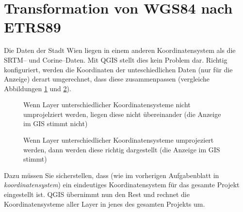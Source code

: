 \documentclass[a4paper,12pt,ngerman]{sphinxmanual}
\begin{document}
\section{Transformation von WGS84 nach ETRS89}
\label{uebung3:transformation-von-wgs84-nach-etrs89}
Die Daten der Stadt Wien liegen in einem anderen Koordinatensystem als die SRTM– und Corine–Daten. Mit QGIS stellt dies kein Problem dar. Richtig konfiguriert, werden die Koordinaten der unteschiedlichen Daten (nur für die Anzeige) derart umgerechnet, dass diese zusammenpassen (vergleiche Abbildungen \hyperref[uebung3:figumprojektion2]{ \ref*{uebung3:figumprojektion2}} und \hyperref[uebung3:figumprojektion1]{ \ref*{uebung3:figumprojektion1}}).
\begin{figure}[htbp]
\centering
\capstart

\caption{Wenn Layer unterschiedlicher Koordinatensysteme nicht umprojelziert werden, liegen diese nicht übereinander (die Anzeige im GIS stimmt nicht)}\label{uebung3:figumprojektion2}\end{figure}
\begin{figure}[htbp]
\centering
\capstart

\caption{Wenn Layer unterschiedlicher Koordinatensysteme umprojeziert werden, dann werden diese richtig dargestellt (die Anzeige im GIS stimmt)}\label{uebung3:figumprojektion1}\end{figure}

Dazu müssen Sie sicherstellen, dass (wie im vorherigen Aufgabenblatt in \emph{koordinatensystem}) ein eindeutiges Koordinatensystem für das gesamte Projekt eingestellt ist. QGIS übernimmt nun den Rest und rechnet die Koordinatensysteme aller Layer in jenes des gesamten Projekts um.
\end{document}
